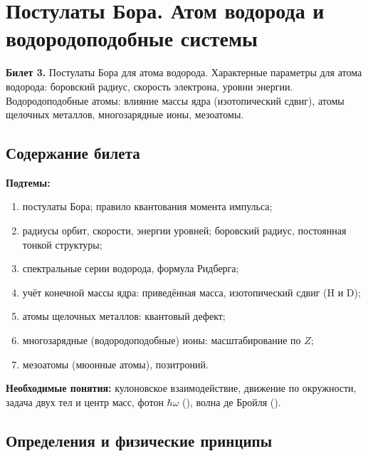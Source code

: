 \chapter[Постулаты Бора. Атом водорода. Водородоподобные атомы]%
        {Постулаты Бора. Атом водорода и водородоподобные системы}
\label{t:03}

\begin{qbox}
\textbf{Билет 3.} Постулаты Бора для атома водорода. Характерные параметры для атома
водорода: боровский радиус, скорость электрона, уровни энергии. Водородоподобные атомы:
влияние массы ядра (изотопический сдвиг), атомы щелочных металлов, многозарядные ионы, мезоатомы.
\end{qbox}

\section{Содержание билета}

\textbf{Подтемы:}
\begin{enumerate}
 \item постулаты Бора; правило квантования момента импульса;
 \item радиусы орбит, скорости, энергии уровней; боровский радиус, постоянная тонкой структуры;
 \item спектральные серии водорода, формула Ридберга;
 \item учёт конечной массы ядра: приведённая масса, изотопический сдвиг (H и D);
 \item атомы щелочных металлов: квантовый дефект;
 \item многозарядные (водородоподобные) ионы: масштабирование по $Z$;
 \item мезоатомы (мюонные атомы), позитроний.
\end{enumerate}

\textbf{Необходимые понятия:} кулоновское взаимодействие, движение по окружности,
задача двух тел и центр масс, фотон $\hbar\omega$ (), волна де Бройля ().

\section{Определения и физические принципы}

